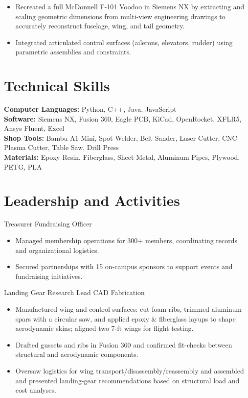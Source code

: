 \begin{itemize}
  \item Recreated a full McDonnell F-101 Voodoo in Siemens NX by extracting and scaling geometric dimensions from multi-view engineering drawings to accurately reconstruct fuselage, wing, and tail geometry.
  \item Integrated articulated control surfaces (ailerons, elevators, rudder) using parametric assemblies and constraints.
\end{itemize}

\section{Technical Skills}
\textbf{Computer Languages:} Python, C++, Java, JavaScript\\
\textbf{Software:} Siemens NX, Fusion 360, Eagle PCB, KiCad, OpenRocket, XFLR5, Ansys Fluent, Excel\\
\textbf{Shop Tools:} Bambu A1 Mini, Spot Welder, Belt Sander, Laser Cutter, CNC Plasma Cutter, Table Saw, Drill Press\\
\textbf{Materials:} Epoxy Resin, Fiberglass, Sheet Metal, Aluminum Pipes, Plywood, PETG, PLA

\section{Leadership and Activities}

Treasurer \textbar{} Fundraising Officer
\begin{itemize}
  \item Managed membership operations for 300+ members, coordinating records and organizational logistics.
  \item Secured partnerships with 15 on-campus sponsors to support events and fundraising initiatives.
\end{itemize}
\entrygap

Landing Gear Research Lead \textbar{} CAD \textbar{} Fabrication
\begin{itemize}
  \item Manufactured wing and control surfaces: cut foam ribs, trimmed aluminum spars with a circular saw, and applied epoxy \& fiberglass layups to shape aerodynamic skins; aligned two 7-ft wings for flight testing.
  \item Drafted gussets and ribs in Fusion 360 and confirmed fit-checks between structural and aerodynamic components.
  \item Oversaw logistics for wing transport/disassembly/reassembly and assembled and presented landing-gear recommendations based on structural load and cost analyses.
\end{itemize}


